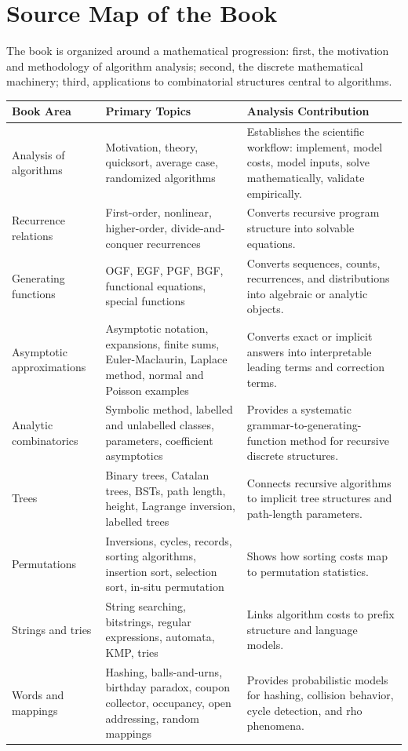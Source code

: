\documentclass[11pt]{article}
\begin{document}
\section{Source Map of the Book}

The book is organized around a mathematical progression: first, the motivation and methodology of algorithm analysis; second, the discrete mathematical machinery; third, applications to combinatorial structures central to algorithms.

\begin{longtable}{L{0.20\textwidth} L{0.26\textwidth} L{0.44\textwidth}}
\toprule
\textbf{Book Area} & \textbf{Primary Topics} & \textbf{Analysis Contribution} \\
\midrule
\endhead
Analysis of algorithms & Motivation, theory, quicksort, average case, randomized algorithms & Establishes the scientific workflow: implement, model costs, model inputs, solve mathematically, validate empirically. \\
Recurrence relations & First-order, nonlinear, higher-order, divide-and-conquer recurrences & Converts recursive program structure into solvable equations. \\
Generating functions & OGF, EGF, PGF, BGF, functional equations, special functions & Converts sequences, counts, recurrences, and distributions into algebraic or analytic objects. \\
Asymptotic approximations & Asymptotic notation, expansions, finite sums, Euler-Maclaurin, Laplace method, normal and Poisson examples & Converts exact or implicit answers into interpretable leading terms and correction terms. \\
Analytic combinatorics & Symbolic method, labelled and unlabelled classes, parameters, coefficient asymptotics & Provides a systematic grammar-to-generating-function method for recursive discrete structures. \\
Trees & Binary trees, Catalan trees, BSTs, path length, height, Lagrange inversion, labelled trees & Connects recursive algorithms to implicit tree structures and path-length parameters. \\
Permutations & Inversions, cycles, records, sorting algorithms, insertion sort, selection sort, in-situ permutation & Shows how sorting costs map to permutation statistics. \\
Strings and tries & String searching, bitstrings, regular expressions, automata, KMP, tries & Links algorithm costs to prefix structure and language models. \\
Words and mappings & Hashing, balls-and-urns, birthday paradox, coupon collector, occupancy, open addressing, random mappings & Provides probabilistic models for hashing, collision behavior, cycle detection, and rho phenomena. \\
\bottomrule
\end{longtable}
\end{document}
